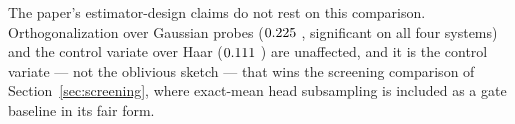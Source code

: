 \documentclass{article}
\begin{document}
The paper's estimator-design claims do not rest on this comparison. Orthogonalization over Gaussian
probes ($0.225$ \fsDeltaOrthoCI{}, significant on all four systems) and the control variate
over Haar ($0.111$ \fsDeltaCVCI{}) are unaffected, and it is the control variate --- not the
oblivious sketch --- that wins the screening comparison of Section~\ref{sec:screening}, where
exact-mean head subsampling is included as a gate baseline in its fair form.


\end{document}
